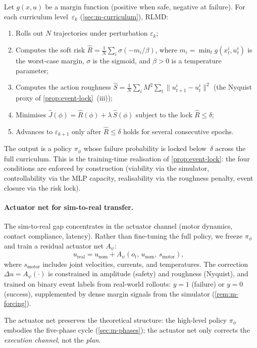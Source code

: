 Let $g(x, u)$ be a margin function (positive when safe,
negative at failure).  For each curriculum level~$\varepsilon_k$
(\cref{sec:m-curriculum}), RLMD:
\begin{enumerate}[label=(\roman*),nosep]
  \item Rolls out $N$ trajectories under perturbation
  $\varepsilon_k$;
  \item Computes the soft risk
  $\hat{R} = \frac{1}{N}\sum_i \sigma(-m_i / \beta)$,
  where $m_i = \min_t g(x_t^i, u_t^i)$ is the worst-case
  margin, $\sigma$ is the sigmoid, and $\beta > 0$ is a
  temperature parameter;
  \item Computes the action roughness
  $\hat{S} = \frac{1}{N}\sum_i M^2 \sum_t \|u_{t+1}^i
  - u_t^i\|^2$ (the Nyquist proxy of
  \cref{prop:event-lock}~(iii));
  \item Minimises
  $\hat{J}(\phi) = \hat{R}(\phi) + \lambda\,\hat{S}(\phi)$
  subject to the lock $\hat{R} \leq \delta$;
  \item Advances to $\varepsilon_{k+1}$ only after $\hat{R}
  \leq \delta$ holds for several consecutive epochs.
\end{enumerate}
The output is a policy $\pi_\phi$ whose failure probability
is locked below~$\delta$ across the full curriculum.
This is the training-time realisation of
\cref{prop:event-lock}: the four conditions are enforced by
construction (viability via the simulator, controllability via
the MLP capacity, realisability via the roughness penalty,
event closure via the risk lock).

\paragraph{Actuator net for sim-to-real transfer.}
The sim-to-real gap concentrates in the actuator channel
(motor dynamics, contact compliance, latency).  Rather than
fine-tuning the full policy, we freeze $\pi_\phi$ and train
a residual actuator net $A_\psi$:
\[
  u_{\mathrm{real}} = u_{\mathrm{nom}} + A_\psi(o_t,\,
  u_{\mathrm{nom}},\, s_{\mathrm{motor}}),
\]
where $s_{\mathrm{motor}}$ includes joint velocities, currents,
and temperatures.  The correction $\Delta u = A_\psi(\cdot)$
is constrained in amplitude (safety) and roughness (Nyquist),
and trained on binary event labels from real-world rollouts:
$y = 1$ (failure) or $y = 0$ (success), supplemented by
dense margin signals from the simulator
(\cref{rem:m-forcing}).

The actuator net preserves the theoretical structure:
the high-level policy $\pi_\phi$ embodies the five-phase
cycle (\cref{sec:m-phases}); the actuator net only corrects
the \emph{execution channel}, not the \emph{plan}.

